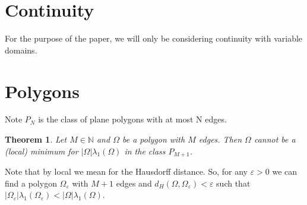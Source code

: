 \documentclass[12pt]{report}
\newtheorem{theorem}{Theorem}[section]
\numberwithin{definition}{section}
\begin{document}
\break

\section{Continuity}
For the purpose of the paper, we will only be considering continuity with variable domains.


\break

\section{Polygons}

Note $P_{N}$ is the class of plane polygons with at most N edges.



\begin{theorem} \label{egm}
  Let $M \in \mathbb{N}$ and $\Omega$ be a polygon with $M$ edges.
  Then $\Omega$ cannot be a (local) minimum for $|\Omega| \lambda_{1}(\Omega)$ in the class $P_{M+1}$.
\end{theorem}

Note that by local we mean for the Hausdorff distance.
So, for any $\varepsilon > 0$ we can find a polygon $\Omega_{\varepsilon}$ with $M+1$ edges and $d_{H}(\Omega,\Omega_{\varepsilon}) < \varepsilon$ such that $| \Omega_{\varepsilon} |\lambda_{1}(\Omega_{\varepsilon}) <  | \Omega |\lambda_{1}(\Omega)$.
\end{document}

